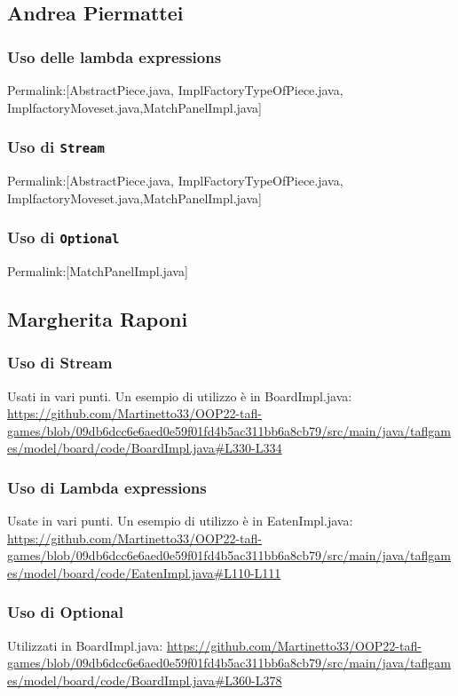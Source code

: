 \documentclass[a4paper,12pt]{report}
\begin{document}
\subsection{Andrea Piermattei}
\subsubsection{Uso delle lambda expressions}
Permalink:[AbstractPiece.java, ImplFactoryTypeOfPiece.java, ImplfactoryMoveset.java,MatchPanelImpl.java]

\subsubsection{Uso di \texttt{Stream}}
Permalink:[AbstractPiece.java, ImplFactoryTypeOfPiece.java, ImplfactoryMoveset.java,MatchPanelImpl.java]

\subsubsection{Uso di \texttt{Optional}}
Permalink:[MatchPanelImpl.java]

\subsection{Margherita Raponi}

\subsubsection{Uso di Stream}
Usati in vari punti. Un esempio di utilizzo è in BoardImpl.java: \url{https://github.com/Martinetto33/OOP22-tafl-games/blob/09db6dcc6e6aed0e59f01fd4b5ac311bb6a8cb79/src/main/java/taflgames/model/board/code/BoardImpl.java#L330-L334}

\subsubsection{Uso di Lambda expressions}
Usate in vari punti. Un esempio di utilizzo è in EatenImpl.java: \url{https://github.com/Martinetto33/OOP22-tafl-games/blob/09db6dcc6e6aed0e59f01fd4b5ac311bb6a8cb79/src/main/java/taflgames/model/board/code/EatenImpl.java#L110-L111}

\subsubsection{Uso di Optional}
Utilizzati in BoardImpl.java: \url{https://github.com/Martinetto33/OOP22-tafl-games/blob/09db6dcc6e6aed0e59f01fd4b5ac311bb6a8cb79/src/main/java/taflgames/model/board/code/BoardImpl.java#L360-L378}
\end{document}
